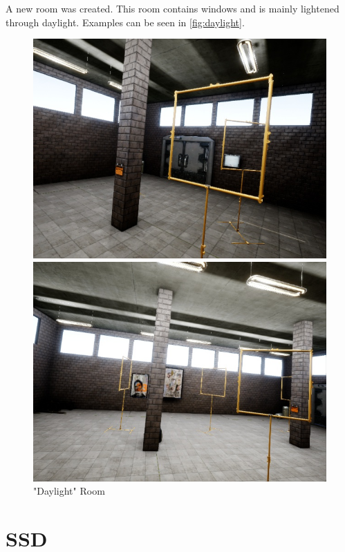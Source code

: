 \documentclass{article}
\begin{document}
A new room was created. This room contains windows and is mainly lightened through daylight. Examples can be seen in \autoref{fig:daylight}.
\begin{figure}
	\centering
	\begin{minipage}{0.4\linewidth}
		\includegraphics[width=\linewidth]{fig/daylight_1}
	\end{minipage}
	\begin{minipage}{0.4\linewidth}
	\includegraphics[width=\linewidth]{fig/daylight_2}
	\end{minipage}
\label{fig:daylight}
\caption{"Daylight" Room}
\end{figure}

\section{SSD}
\end{document}

